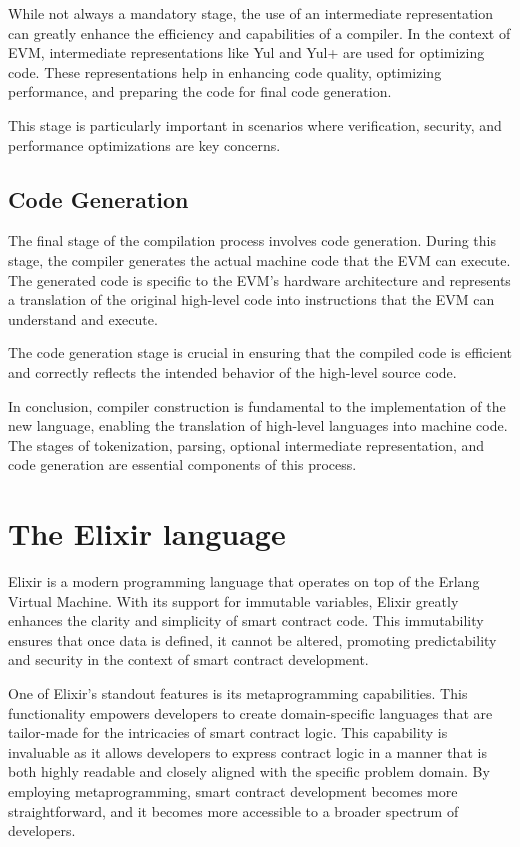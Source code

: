 While not always a mandatory stage, the use of an intermediate representation can greatly enhance the efficiency and capabilities of a compiler. In the context of EVM, intermediate representations like Yul and Yul+ are used for optimizing code. These representations help in enhancing code quality, optimizing performance, and preparing the code for final code generation.

This stage is particularly important in scenarios where verification, security, and performance optimizations are key concerns.

\subsection{Code Generation}

The final stage of the compilation process involves code generation. During this stage, the compiler generates the actual machine code that the EVM can execute. The generated code is specific to the EVM's hardware architecture and represents a translation of the original high-level code into instructions that the EVM can understand and execute.

The code generation stage is crucial in ensuring that the compiled code is efficient and correctly reflects the intended behavior of the high-level source code.


In conclusion, compiler construction is fundamental to the implementation of the new language, enabling the translation of high-level languages into machine code. The stages of tokenization, parsing, optional intermediate representation, and code generation are essential components of this process.

\section{The Elixir language}
\label{sec:ex}

Elixir is a modern programming language that operates on top of the Erlang Virtual Machine. With its support for immutable variables, Elixir greatly enhances the clarity and simplicity of smart contract code. This immutability ensures that once data is defined, it cannot be altered, promoting predictability and security in the context of smart contract development.

One of Elixir's standout features is its metaprogramming capabilities. This functionality empowers developers to create domain-specific languages that are tailor-made for the intricacies of smart contract logic. This capability is invaluable as it allows developers to express contract logic in a manner that is both highly readable and closely aligned with the specific problem domain. By employing metaprogramming, smart contract development becomes more straightforward, and it becomes more accessible to a broader spectrum of developers.

